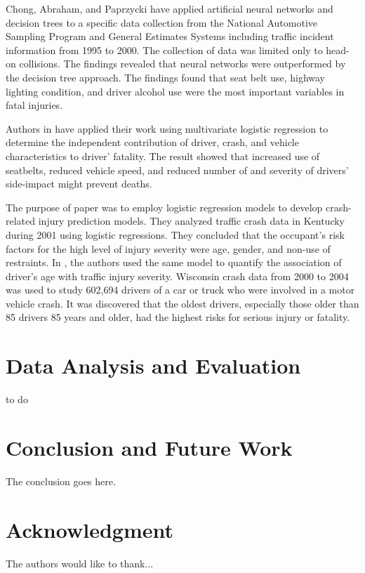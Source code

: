 \documentclass[conference]{IEEEtran}
\begin{document}
Chong, Abraham, and Paprzycki \cite{chong2004traffic} have applied artificial neural networks and decision trees to a specific data collection from the National Automotive Sampling Program and General Estimates Systems including traffic incident information from 1995 to 2000. The collection of data was limited only to head-on collisions. The findings revealed that neural networks were outperformed by the decision tree approach. The findings found that seat belt use, highway lighting condition, and driver alcohol use were the most important variables in fatal injuries.

Authors in \cite{Bedard} have applied their work using multivariate logistic regression to determine the independent contribution of driver, crash, and vehicle characteristics to driver' fatality. The result showed that increased use of seatbelts, reduced vehicle speed, and reduced number of and severity of drivers' side-impact might prevent deaths.

The purpose of paper \cite{SingletonFactors} was to employ logistic regression models to develop crash-related injury prediction models. They analyzed traffic crash data in Kentucky during 2001 using logistic regressions. They concluded that the occupant’s risk factors for the high level of injury severity were age, gender, and non-use of restraints. In \cite{ associationHanrahan}, the authors used the same model to quantify the association of driver’s age with traffic injury severity. Wisconsin crash data from 2000 to 2004 was used to study 602,694 drivers of a car or truck who were involved in a motor vehicle crash. It was discovered that the oldest drivers, especially those older than 85 drivers 85 years and older, had the highest risks for serious injury or fatality.


\section{Data Analysis and Evaluation}
to do


\section{Conclusion and Future Work}
The conclusion goes here.
 





\section*{Acknowledgment}
The authors would like to thank...



{\small}
 
\end{document}
